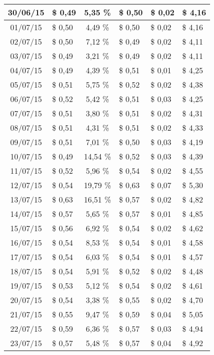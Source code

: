 \begin{center}
\begin{small}
\begin{longtable}{|c|l|c|l|l|l|}
30/06/15 & \$ 0,49 & 5,35 \% & \$ 0,50 & \$ 0,02 & \$ 4,16 \\ \hline
01/07/15 & \$ 0,50 & 4,49 \% & \$ 0,50 & \$ 0,02 & \$ 4,16 \\ \hline
02/07/15 & \$ 0,50 & 7,12 \% & \$ 0,49 & \$ 0,02 & \$ 4,11 \\ \hline
03/07/15 & \$ 0,49 & 3,21 \% & \$ 0,49 & \$ 0,02 & \$ 4,11 \\ \hline
04/07/15 & \$ 0,49 & 4,39 \% & \$ 0,51 & \$ 0,01 & \$ 4,25 \\ \hline
05/07/15 & \$ 0,51 & 5,75 \% & \$ 0,52 & \$ 0,02 & \$ 4,38 \\ \hline
06/07/15 & \$ 0,52 & 5,42 \% & \$ 0,51 & \$ 0,03 & \$ 4,25 \\ \hline
07/07/15 & \$ 0,51 & 3,80 \% & \$ 0,51 & \$ 0,02 & \$ 4,31 \\ \hline
08/07/15 & \$ 0,51 & 4,31 \% & \$ 0,51 & \$ 0,02 & \$ 4,33 \\ \hline
09/07/15 & \$ 0,51 & 7,01 \% & \$ 0,50 & \$ 0,03 & \$ 4,19 \\ \hline
10/07/15 & \$ 0,49 & 14,54 \% & \$ 0,52 & \$ 0,03 & \$ 4,39 \\ \hline
11/07/15 & \$ 0,52 & 5,96 \% & \$ 0,54 & \$ 0,02 & \$ 4,55 \\ \hline
12/07/15 & \$ 0,54 & 19,79 \% & \$ 0,63 & \$ 0,07 & \$ 5,30 \\ \hline
13/07/15 & \$ 0,63 & 16,51 \% & \$ 0,57 & \$ 0,02 & \$ 4,82 \\ \hline
14/07/15 & \$ 0,57 & 5,65 \% & \$ 0,57 & \$ 0,01 & \$ 4,85 \\ \hline
15/07/15 & \$ 0,56 & 6,92 \% & \$ 0,54 & \$ 0,02 & \$ 4,62 \\ \hline
16/07/15 & \$ 0,54 & 8,53 \% & \$ 0,54 & \$ 0,01 & \$ 4,58 \\ \hline
17/07/15 & \$ 0,54 & 6,03 \% & \$ 0,54 & \$ 0,01 & \$ 4,57 \\ \hline
18/07/15 & \$ 0,54 & 5,91 \% & \$ 0,52 & \$ 0,02 & \$ 4,48 \\ \hline
19/07/15 & \$ 0,53 & 5,12 \% & \$ 0,54 & \$ 0,02 & \$ 4,61 \\ \hline
20/07/15 & \$ 0,54 & 3,38 \% & \$ 0,55 & \$ 0,02 & \$ 4,70 \\ \hline
21/07/15 & \$ 0,55 & 9,47 \% & \$ 0,59 & \$ 0,04 & \$ 5,05 \\ \hline
22/07/15 & \$ 0,59 & 6,36 \% & \$ 0,57 & \$ 0,03 & \$ 4,94 \\ \hline
23/07/15 & \$ 0,57 & 5,48 \% & \$ 0,57 & \$ 0,04 & \$ 4,92 \\ \hline

\end{longtable}
\end{small}
\end{center}
